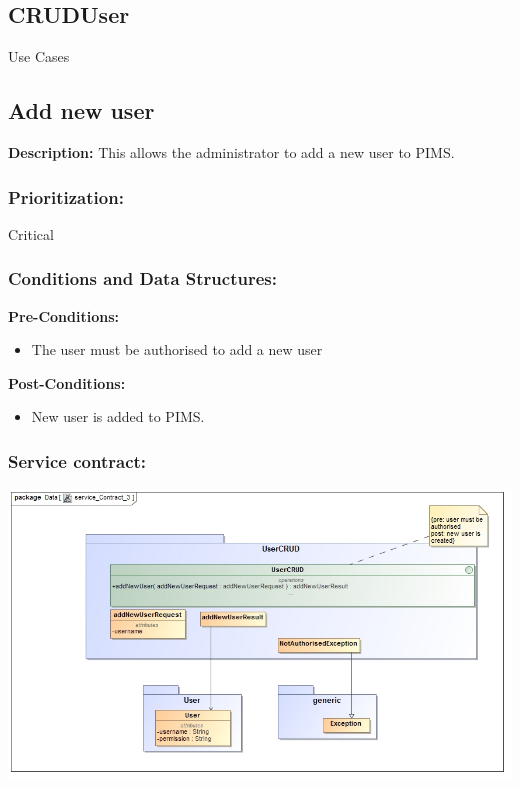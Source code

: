 \newpage
\setlength{\voffset}{-3cm}

\begin{center}
\section{\textbf{\huge{CRUDUser}}}

\Large{Use Cases}
\end{center}


\subsection{Add new user}
\textbf{Description:}
This allows the administrator to add a new user to PIMS.
\subsubsection{Prioritization:}
Critical
\subsubsection{Conditions and Data Structures:}
\textbf{Pre-Conditions:}
\begin{itemize}
	\item The user must be authorised to add a new user
\end{itemize}

\textbf{Post-Conditions:}	
\begin{itemize}
	\item New user is added to PIMS.
\end{itemize}

\subsubsection{Service contract:}
\includegraphics[width=1\linewidth]{./Graphics/4.jpg}
